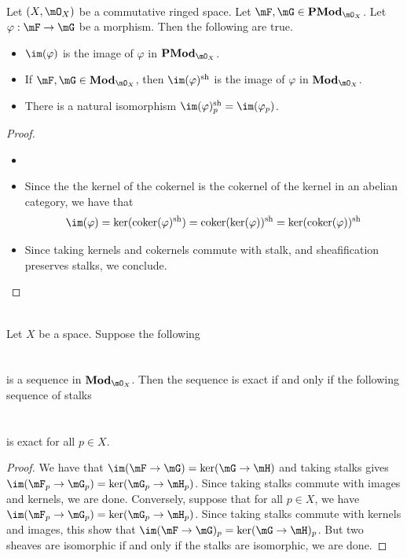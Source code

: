 \documentclass[a4paper]{article}
\begin{document}
\begin{prp}{}{}\\
Let $(X,\mO_X)$ be a commutative ringed space. Let $\mF,\mG\in\bold{PMod}_{\mO_X}$. Let $\varphi:\mF\to\mG$ be a morphism. Then the following are true. 
\begin{itemize}
\item $\im(\varphi)$ is the image of $\varphi$ in $\bold{PMod}_{\mO_X}$. 
\item If $\mF,\mG\in\bold{Mod}_{\mO_X}$, then $\im(\varphi)^\text{sh}$ is the image of $\varphi$ in $\bold{Mod}_{\mO_X}$. 
\item There is a natural isomorphism $\im(\varphi)_p^\text{sh}=\im(\varphi_p)$. 
\end{itemize}
\begin{proof}
\begin{itemize}
\item
\item Since the the kernel of the cokernel is the cokernel of the kernel in an abelian category, we have that $$\im(\varphi)=\ker(\text{coker}(\varphi)^\text{sh})=\text{coker}(\ker(\varphi))^\text{sh}=\ker(\text{coker}(\varphi))^\text{sh}$$
\item Since taking kernels and cokernels commute with stalk, and sheafification preserves stalks, we conclude. 
\end{itemize}
\end{proof}
\end{prp}

\begin{prp}{}{}\\
Let $X$ be a space. Suppose the following \\
 \\~\\
is a sequence in $\bold{Mod}_{\mO_X}$. Then the sequence is exact if and only if the following sequence of stalks\\
 \\~\\
is exact for all $p\in X$. 
\begin{proof}
We have that $\im(\mF\to\mG)=\ker(\mG\to\mH)$ and taking stalks gives $\im(\mF_p\to\mG_p)=\ker(\mG_p\to\mH_p)$. Since taking stalks commute with images and kernels, we are done. Conversely, suppose that for all $p\in X$, we have $\im(\mF_p\to\mG_p)=\ker(\mG_p\to\mH_p)$. Since taking stalks commute with kernels and images, this show that $\im(\mF\to\mG)_p=\ker(\mG\to\mH)_p$. But two sheaves are isomorphic if and only if the stalks are isomorphic, we are done. 
\end{proof}
\end{prp}
\end{document}
